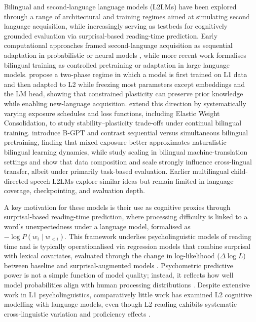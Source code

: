 Bilingual and second-language language models (L2LMs) have been explored through a range of architectural and training regimes aimed at simulating second language acquisition, while increasingly serving as testbeds for cognitively grounded evaluation via surprisal-based reading-time prediction. Early computational approaches framed second-language acquisition as sequential adaptation in probabilistic or neural models \citep{matusevych-etal-2013-computational}, while more recent work formalises bilingual training as controlled pretraining or adaptation in large language models. \citet{aoyama2024modeling} propose a two-phase regime in which a model is first trained on L1 data and then adapted to L2 while freezing most parameters except embeddings and the LM head, showing that constrained plasticity can preserve prior knowledge while enabling new-language acquisition. \citet{constantinescu2025investigating} extend this direction by systematically varying exposure schedules and loss functions, including Elastic Weight Consolidation, to study stability–plasticity trade-offs under continual bilingual training. \citet{arnett-etal-2025-acquisition} introduce B-GPT and contrast sequential versus simultaneous bilingual pretraining, finding that mixed exposure better approximates naturalistic bilingual learning dynamics, while \citet{feng2026bilingual} study scaling in bilingual machine-translation settings and show that data composition and scale strongly influence cross-lingual transfer, albeit under primarily task-based evaluation. Earlier multilingual child-directed-speech L2LMs \citep{yadavalli-etal-2023-slabert, oba-etal-2023-second} explore similar ideas but remain limited in language coverage, checkpointing, and evaluation depth.
 
A key motivation for these models is their use as cognitive proxies through surprisal-based reading-time prediction, where processing difficulty is linked to a word’s unexpectedness under a language model, formalised as $-\log P(w_i \mid w_{<i})$. This framework underlies psycholinguistic models of reading time and is typically operationalised via regression models that combine surprisal with lexical covariates, evaluated through the change in log-likelihood ($\Delta\log L$) between baseline and surprisal-augmented models \citep{wilcox2020predictive, kaye2025sentence}. Psychometric predictive power is not a simple function of model quality; instead, it reflects how well model probabilities align with human processing distributions \citep{de-varda-marelli-2022-effects, goodkind2018predictive, shain2024large}. Despite extensive work in L1 psycholinguistics, comparatively little work has examined L2 cognitive modelling with language models, even though L2 reading exhibits systematic cross-linguistic variation and proficiency effects \citep{hillert1998sentence, meister2021revisiting, kuribayashi-etal-2021-lower}.
 
